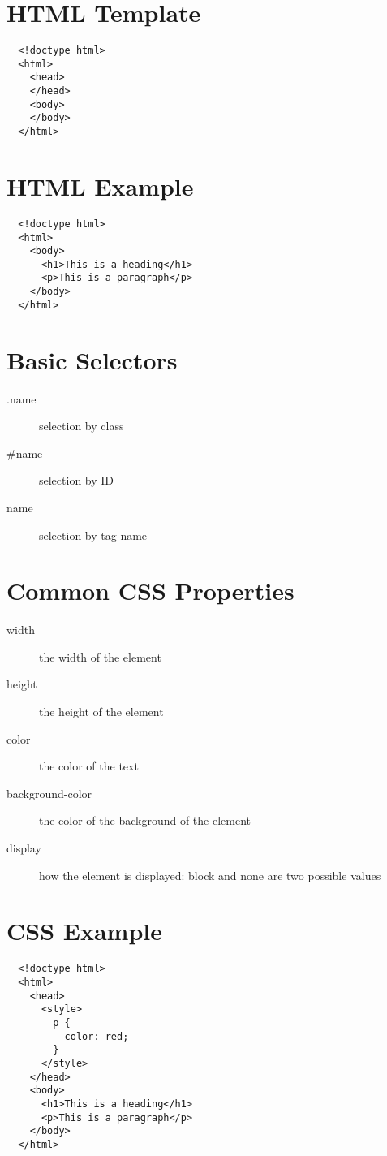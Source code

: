 \documentclass[letterpage,foldmark,10pt]{leaflet}
\begin{document}
\section{HTML Template}
\begin{verbatim}
  <!doctype html>
  <html>
    <head>
    </head>
    <body>
    </body>
  </html>
\end{verbatim}
\newpage
\section{HTML Example}
\begin{verbatim}
  <!doctype html>
  <html>
    <body>
      <h1>This is a heading</h1>
      <p>This is a paragraph</p>
    </body>
  </html>
\end{verbatim}

\section{Basic Selectors}
\begin{description}
  \item [.name] selection by class
  \item [\#name] selection by ID
  \item [name] selection by tag name
\end{description}

\section{Common CSS Properties}
\begin{description}
  \item [width] the width of the element
  \item [height] the height of the element
  \item [color] the color of the text
  \item [background-color] the color of the background of the element
  \item [display] how the element is displayed: block and none are two possible values
\end{description}
\section{CSS Example}
\begin{verbatim}
  <!doctype html>
  <html>
    <head>
      <style>
        p {
          color: red;
        }
      </style>
    </head>
    <body>
      <h1>This is a heading</h1>
      <p>This is a paragraph</p>
    </body>
  </html>
\end{verbatim}
\end{document}
